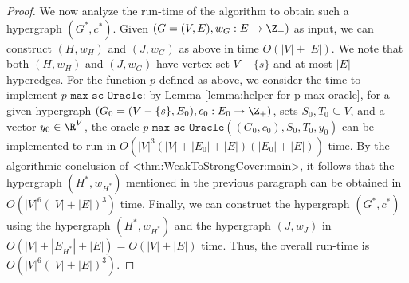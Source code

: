 \documentclass{article}
\def\Cref#1{<#1>}%
\newcommand{\functionMaximizationOracleStrongCover}[1]{\ensuremath{{#1}\text{-}\mathtt{max}\text{-}\mathtt{sc}\text{-}\mathtt{Oracle}}\xspace}
\begin{document}
\begin{proof}
   We now analyze the run-time of the algorithm to obtain such a hypergraph $(G^*, c^*)$. Given $(G=(V, E), w_G: E\rightarrow \Z_+)$ as input, we can construct $(H, w_H)$ and $(J, w_G)$ as above in time $O(|V| + |E|)$. We note that both $(H, w_H)$ and $(J, w_G)$ have vertex set $V-\{s\}$ and at most $|E|$ hyperedges. For the function $p$ defined as above, we consider the time to implement \functionMaximizationOracleStrongCover{p}: by Lemma \ref{lemma:helper-for-p-max-oracle}, for a given hypergraph $(G_0=(V-\{s\}, E_0), c_0: E_0\rightarrow \Z_+)$, sets $S_0, T_0\subseteq V$, and a vector $y_0\in \R^V$, the oracle \functionMaximizationOracleStrongCover{p}$((G_0, c_0), S_0, T_0, y_0)$ can be implemented to run in $O(|V|^3(|V|+|E_0|+|E|)(|E_0|+|E|))$ time. By the algorithmic conclusion of \Cref{thm:WeakToStrongCover:main}, it follows that the hypergraph $(H^*, w_{H^*})$ mentioned in the previous paragraph can be obtained in $O(|V|^6(|V|+|E|)^3)$ time. Finally, we can construct the hypergraph $(G^*, c^*)$ using the hypergraph $(H^*, w_{H^*})$ and the hypergraph $(J, w_J)$ in $O(|V|+|E_{H^*}|+|E|)=O(|V|+|E|)$ time. Thus, the overall run-time is $O(|V|^6(|V|+|E|)^3)$.
\end{proof}
\end{document}
